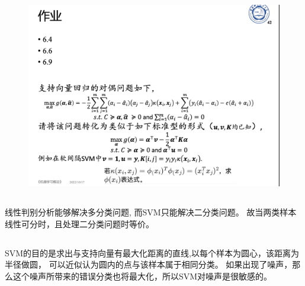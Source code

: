 \documentclass[UTF8,a4paper,AutoFakeBold,AutoFakeSlant]{article}
\begin{document}
\begin{figure}[H]
  \centering
  \includegraphics[scale=0.35]{hw6.png}
  \label{f7}
\end{figure}


\subsection{}

线性判别分析能够解决多分类问题, 而SVM只能解决二分类问题。
故当两类样本线性可分时，且处理二分类问题时等价。



\subsection{}

SVM的目的是求出与支持向量有最大化距离的直线,以每个样本为圆心，该距离为半径做圆，
可以近似认为圆内的点与该样本属于相同分类。
如果出现了噪声，那么这个噪声所带来的错误分类也将最大化，所以SVM对噪声是很敏感的。



\subsection{}
\end{document}
